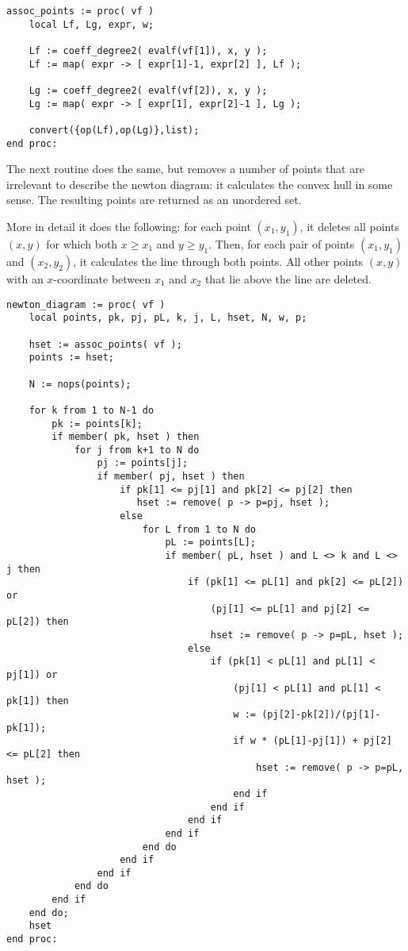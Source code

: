 \documentclass[a4paper,10pt]{article}
\begin{document}
\begin{lstlisting}[name=blowup]
assoc_points := proc( vf )
    local Lf, Lg, expr, w;

    Lf := coeff_degree2( evalf(vf[1]), x, y );
    Lf := map( expr -> [ expr[1]-1, expr[2] ], Lf );

    Lg := coeff_degree2( evalf(vf[2]), x, y );
    Lg := map( expr -> [ expr[1], expr[2]-1 ], Lg );

    convert({op(Lf),op(Lg)},list);
end proc:
\end{lstlisting}

The next routine does the same, but removes a number of points that are irrelevant to describe the
newton diagram: it calculates the convex hull in some sense.  The resulting points are returned
as an unordered set.
\medskip

\noindent More in detail it does the following:  for each point $(x_1,y_1)$, it deletes all points $(x,y)$
for which both $x\geq x_1$ and $y\geq y_1$.  Then, for each pair of points $(x_1,y_1)$ and
$(x_2,y_2)$, it calculates the line through both points.  All other points $(x,y)$ with an $x$-coordinate
between $x_1$ and $x_2$ that lie above the line are deleted.

\begin{lstlisting}[name=blowup]
newton_diagram := proc( vf )
    local points, pk, pj, pL, k, j, L, hset, N, w, p;

    hset := assoc_points( vf );
    points := hset;

    N := nops(points);

    for k from 1 to N-1 do
        pk := points[k];
        if member( pk, hset ) then
            for j from k+1 to N do
                pj := points[j];
                if member( pj, hset ) then
                    if pk[1] <= pj[1] and pk[2] <= pj[2] then
                       hset := remove( p -> p=pj, hset );
                    else
                        for L from 1 to N do
                            pL := points[L];
                            if member( pL, hset ) and L <> k and L <> j then
                                if (pk[1] <= pL[1] and pk[2] <= pL[2]) or
                                    (pj[1] <= pL[1] and pj[2] <= pL[2]) then
                                    hset := remove( p -> p=pL, hset );
                                else
                                    if (pk[1] < pL[1] and pL[1] < pj[1]) or
                                        (pj[1] < pL[1] and pL[1] < pk[1]) then
                                        w := (pj[2]-pk[2])/(pj[1]-pk[1]);
                                        if w * (pL[1]-pj[1]) + pj[2] <= pL[2] then
                                            hset := remove( p -> p=pL, hset );
                                        end if
                                    end if
                                end if
                            end if
                        end do
                    end if
                end if
            end do
        end if
    end do;
    hset
end proc:
\end{lstlisting}
\end{document}
